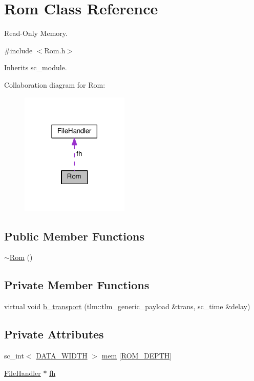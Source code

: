 \hypertarget{classRom}{\section{Rom Class Reference}
\label{classRom}
}


Read-\/\+Only Memory.  




{\ttfamily \#include $<$Rom.\+h$>$}



Inherits sc\+\_\+module.



Collaboration diagram for Rom\+:\nopagebreak
\begin{figure}[H]
\begin{center}
\leavevmode
\includegraphics[width=146pt]{classRom__coll__graph}
\end{center}
\end{figure}
\subsection*{Public Member Functions}
\begin{DoxyCompactItemize}
\item 
\hyperlink{classRom_a7ae10e2c40489fc7e5727694dab3e906}{$\sim$\+Rom} ()
\end{DoxyCompactItemize}
\subsection*{Private Member Functions}
\begin{DoxyCompactItemize}
\item 
virtual void \hyperlink{classRom_aabdd0ab7da327cd8c5359846c1692da0}{b\+\_\+transport} (tlm\+::tlm\+\_\+generic\+\_\+payload \&trans, sc\+\_\+time \&delay)
\end{DoxyCompactItemize}
\subsection*{Private Attributes}
\begin{DoxyCompactItemize}
\item 
sc\+\_\+int$<$ \hyperlink{Defines_8h_af087b76f9707be9d3b43ba0c782c31c3}{D\+A\+T\+A\+\_\+\+W\+I\+D\+T\+H} $>$ \hyperlink{classRom_af33d606aaf92751fe6b489b6c5fff4f4}{mem} \mbox{[}\hyperlink{Defines_8h_a3744909059435c19ead1ff15e0fb3257}{R\+O\+M\+\_\+\+D\+E\+P\+T\+H}\mbox{]}
\item 
\hyperlink{classFileHandler}{File\+Handler} $\ast$ \hyperlink{classRom_ad7d70385f6cd68a97c89c48f4590cbb1}{fh}
\end{DoxyCompactItemize}


